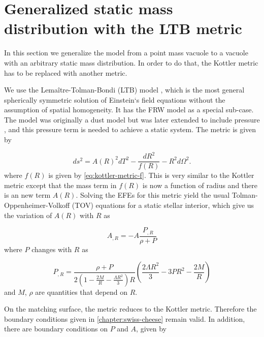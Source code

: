 \chapter{Generalized static mass distribution with the LTB metric}
\label{appendix:ltb}

In this section we generalize the model from a point mass vacuole to a vacuole with an arbitrary static mass distribution. In order to do that, the Kottler metric has to be replaced with another metric. 

We use the Lema\^itre-Tolman-Bondi (LTB) model \citep{tolman1934effect,bondi1947spherically,lemaitre1933expansion}, which is the most general spherically symmetric solution of Einstein`s field equations without the assumption of spatial homogeneity. It has the FRW model as a special sub-case. The model was originally a dust model but was later extended to include pressure \citep{lasky2006generalized}, and this pressure term is needed to achieve a static system. The metric is given by

\begin{equation}
  ds^2 = A(R)^2 dT^2 - \frac{dR^2}{f(R)} - R^2 d \Omega^2.
  \label{eq:ltb-metric}
\end{equation}
where $f(R)$ is given by \autoref{eq:kottler-metric-f}. This is very similar to the Kottler metric except that the mass term in $f(R)$ is now a function of radius and there is an new term $A(R)$. Solving the EFEs for this metric yield the usual Tolman-Oppenheimer-Volkoff (TOV) equations \citep{tolman1939static,oppenheimer1939massive} for a static stellar interior, which give us the variation of $A(R)$ with $R$ as

\begin{equation}
  A_{,R} = - A \frac{P_{,R}}{\rho + P}
  \label{eq:alpha-evolution}
\end{equation}
where $P$ changes with $R$ as

\begin{equation}
  P_{,R} = \frac{\rho + P}{2\left (1- \frac{2M}{R} - \frac{\Lambda R^2}{3}\right )R}
  \left (\frac{2 \Lambda R^2}{3}  -3PR^2 -\frac{2M}{R} \right ) 
  \label{eq:pressure-P-evolution}
\end{equation}
and $M$, $\rho$ are quantities that depend on $R$. 


On the matching surface, the metric reduces to the Kottler metric. Therefore the boundary conditions given in \autoref{chapter:swiss-cheese} remain valid. In addition, there are boundary conditions on $P$ and $A$, given by


